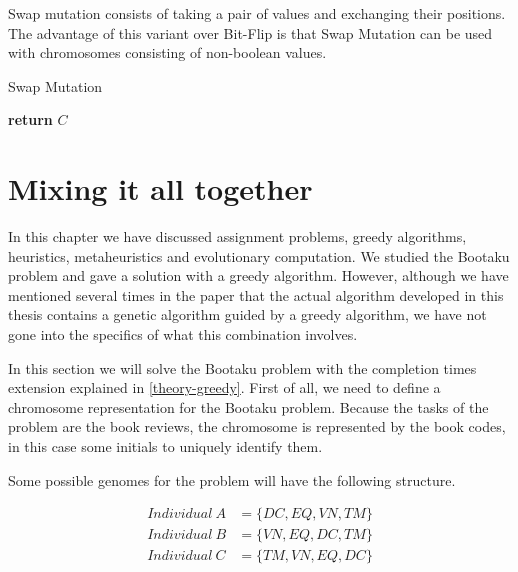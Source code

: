 Swap mutation consists of taking a pair of values and exchanging their positions. The advantage of this variant over Bit-Flip is that Swap Mutation can be used with chromosomes consisting of non-boolean values. 

\begin{algorithm}[H]
    \caption{Swap Mutation}
    \label{theory-ga-sm}
    \begin{algorithmic}[1]
            \EndWhile
            \State \textbf{return} $C$
        \EndProcedure
    \end{algorithmic}
\end{algorithm}



\section{Mixing it all together}

In this chapter we have discussed assignment problems, greedy algorithms, heuristics, metaheuristics and evolutionary computation. We studied the Bootaku problem and gave a solution with a greedy algorithm. However, although we have mentioned several times in the paper that the actual algorithm developed in this thesis contains a genetic algorithm guided by a greedy algorithm, we have not gone into the specifics of what this combination involves.

In this section we will solve the Bootaku problem with the completion times extension explained in \ref{theory-greedy}. First of all, we need to define a chromosome representation for the Bootaku problem. Because the tasks of the problem are the book reviews, the chromosome is represented by the book codes, in this case some initials to uniquely identify them.

Some possible genomes for the problem will have the following structure.

\begin{align}
    Individual\ A &= \{ DC, EQ, VN, TM \}\\
    Individual\ B &= \{ VN, EQ, DC, TM \}\\
    Individual\ C &= \{ TM, VN, EQ, DC \}
\end{align}

